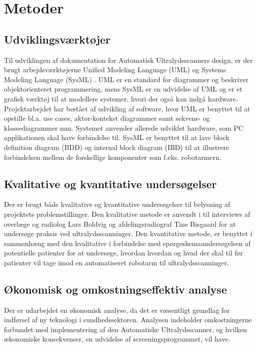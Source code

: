 \chapter{Metoder}\label{Metoder}

\section{Udviklingsværktøjer} 
Til udviklingen af dokumentation for Automatisk Ultralydsscanners design, er der brugt arbejdsværktøjerne Unified Modeling Language (UML) \cite{UML} og Systems Modeling Language (SysML) \cite{SysML}. UML er en standard for diagrammer og beskriver objektorienteret programmering, mens SysML er en udvidelse af UML og er et grafisk værktøj til at modellere systemer, hvori der også kan indgå hardware. Projektarbejdet har bestået af udvikling af software, hvor  UML er benyttet til at opstille bl.a. use cases, aktør-kontekst diagrammer samt sekvens- og klassediagrammer mm. Systemet anvender allerede udviklet hardware, som PC applikationen skal have forbindelse til. SysML er benyttet til at lave block definition diagram (BDD) og internal block diagram (IBD) til at illustrere forbindelsen mellem de forskellige komponenter som f.eks. robotarmern.

\section{Kvalitative og kvantitative undersøgelser}
Der er brugt både kvalitative og kvantitative undersøgelser til belysning af projektets problemstillinger. Den kvalitative metode er anvendt i til interviews af overlæge og radiolog Lars Boldvig og afdelingsradiograf Tine Bisgaard for at undersøge praksis ved ultralydsscanninger. Den kvantitative metode,  er benyttet i sammenhæng med den kvalitative i forbindelse med spørgeskemaundersøgelsen af potentielle patienter for at undersøge, hvordan hvordan og hvad der skal til før patienter vil tage imod en automatiseret robotarm til ultralydsscanninger.  

\section{Økonomisk og omkostningseffektiv analyse}
Der er udarbejdet en økonomisk analyse, da det er væsentligt grundlag for indførsel af ny teknologi i sundhedssektoren. Analysen indeholder omkostningerne forbundet med implementering af den Automatiske Ultralydsscanner, og hvilken ækonomiske konsekvenser, en udvidelse af screeningsprogrammet, vil have. 

